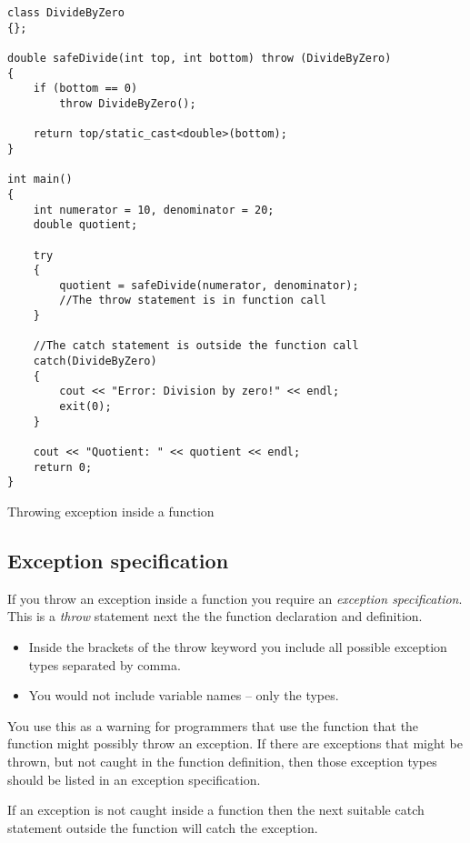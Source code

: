 \begin{listing}[H]
\begin{verbatim}
class DivideByZero
{};

double safeDivide(int top, int bottom) throw (DivideByZero)
{
	if (bottom == 0)
		throw DivideByZero();
		
	return top/static_cast<double>(bottom);
}

int main()
{
	int numerator = 10, denominator = 20;
	double quotient;
	
	try
	{
		quotient = safeDivide(numerator, denominator);
		//The throw statement is in function call
	}
	
	//The catch statement is outside the function call
	catch(DivideByZero)
	{
		cout << "Error: Division by zero!" << endl;
		exit(0);
	}
	
	cout << "Quotient: " << quotient << endl;
	return 0;
}
\end{verbatim}
\caption{Throwing exception inside a function}
\label{source_code_1}
\end{listing}




\subsection{Exception specification}
If you throw an exception inside a function you require an \emph{exception specification}. This is
a \emph{throw} statement next the the function declaration and definition.
\begin{itemize}
	\item Inside the brackets of the throw keyword you include all possible exception types
	separated by comma.
	\item You would not include variable names -- only the types.
\end{itemize}

You use this as a warning for programmers that use the function that the function might possibly
throw an exception. If there are exceptions that might be thrown, but not caught in the function
definition, then those exception types should be listed in an exception specification.

If an exception is not caught inside a function then the next suitable catch statement outside the
function will catch the exception.

